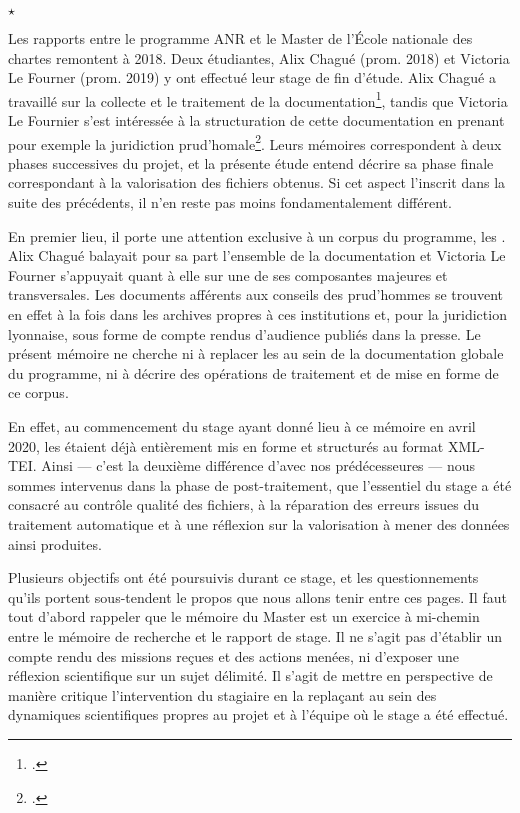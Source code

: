 \begin{center}
$\star$
\end{center} 

Les rapports entre le programme ANR \timeus{} et le Master \tnah{} de l'École nationale des chartes remontent à 2018. Deux étudiantes, Alix Chagué (prom. 2018) et Victoria Le Fourner (prom. 2019) y ont effectué leur stage de fin d'étude. Alix Chagué a travaillé sur la collecte et le traitement de la documentation\footcite{chague}, tandis que Victoria Le Fournier s'est intéressée à la structuration de cette documentation en prenant pour exemple la juridiction prud'homale\footcite{lefourner}. Leurs mémoires correspondent à deux phases successives du projet, et la présente étude entend décrire sa phase finale correspondant à la valorisation des fichiers obtenus. Si cet aspect l'inscrit dans la suite des précédents, il n'en reste pas moins fondamentalement différent.

En premier lieu, il porte une attention exclusive à un corpus du programme, les \odm. Alix Chagué balayait pour sa part l'ensemble de la documentation et Victoria Le Fourner s'appuyait quant à elle sur une de ses composantes majeures et transversales. Les documents afférents aux conseils des prud'hommes se trouvent en effet à la fois dans les archives propres à ces institutions et, pour la juridiction lyonnaise, sous forme de compte rendus d'audience publiés dans la presse. Le présent mémoire ne cherche ni à replacer les \odm{} au sein de la documentation globale du programme, ni à décrire des opérations de traitement et de mise en forme de ce corpus.

En effet, au commencement du stage ayant donné lieu à ce mémoire en avril 2020, les \odm{} étaient déjà entièrement mis en forme et structurés au format XML-TEI. Ainsi --- c'est la deuxième différence d'avec nos prédécesseures --- nous sommes intervenus dans la phase de post-traitement, \cad{} que l'essentiel du stage a été consacré au contrôle qualité des fichiers, à la réparation des erreurs issues du traitement automatique et à une réflexion sur la valorisation à mener des données ainsi produites.

Plusieurs objectifs ont été poursuivis durant ce stage, et les questionnements qu'ils portent sous-tendent le propos que nous allons tenir entre ces pages. Il faut tout d'abord rappeler que le mémoire du Master \tnah{} est un exercice à mi-chemin entre le mémoire de recherche et le rapport de stage. Il ne s'agit pas d'établir un compte rendu des missions reçues et des actions menées, ni d'exposer une réflexion scientifique sur un sujet délimité. Il s'agit de mettre en perspective de manière critique l'intervention du stagiaire en la replaçant au sein des dynamiques scientifiques propres au projet et à l'équipe où le stage a été effectué.

